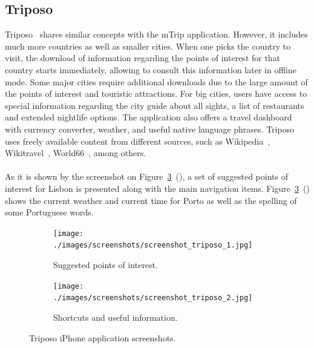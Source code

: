 \subsection{Triposo}
Triposo~\cite{triposo} shares similar concepts with the mTrip application. However, it includes much more countries as well as smaller cities. When one picks the country to visit, the download of information regarding the points of interest for that country starts immediately, allowing to consult this information later in offline mode. Some major cities require additional downloads due to the large amount of the points of interest and touristic attractions. For big cities, users have access to special information regarding the city guide about all sights, a list of restaurants and extended nightlife options. The application also offers a travel dashboard with currency converter, weather, and useful native language phrases. Triposo uses freely available content from different sources, such as Wikipedia~\cite{wikipedia}, Wikitravel~\cite{wikitravel}, World66~\cite{world66}, among others.\\
\\
As it is shown by the screenshot on Figure~\ref{fig:triposoScreenshots}~(), a set of suggested points of interest for Lisbon is presented along with the main navigation items. Figure~\ref{fig:triposoScreenshots}~() shows the current weather and current time for Porto as well as the spelling of some Portuguese words.\\
\begin{figure}
        \centering
        \begin{subfigure}[b]{0.25\textwidth}
                \centering
                \texttt{[image: ./images/screenshots/screenshot\_triposo\_1.jpg]}
                \caption{Suggested points of interest.}
                \label{fig:triposoSuggestedPointsOfInterest}
        \end{subfigure}%
        \quad\quad\quad\quad\quad
        \begin{subfigure}[b]{0.25\textwidth}
                \centering
                \texttt{[image: ./images/screenshots/screenshot\_triposo\_2.jpg]}
                \caption{Shortcuts and useful information.}
                \label{fig:triposoWeahtherTime}
        \end{subfigure}%
        \caption{Triposo iPhone application screenshots.}
        \label{fig:triposoScreenshots}
\end{figure}


